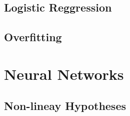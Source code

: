 \documentclass[en,11pt,english,black,simple,device=ppt]{elegantbook}
\begin{document}
\section{Logistic Reggression}



\section{Overfitting}



\chapter{Neural Networks}

\section{Non-lineay Hypotheses}


\end{document}
